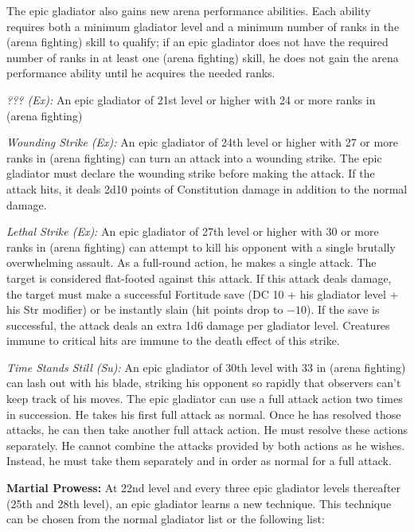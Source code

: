 The epic gladiator also gains new arena performance abilities. Each ability requires both a minimum gladiator level and a minimum number of ranks in the  (arena fighting) skill to qualify; if an epic gladiator does not have the required number of ranks in at least one  (arena fighting) skill, he does not gain the arena performance ability until he acquires the needed ranks.

\textit{??? (Ex):} An epic gladiator of 21st level or higher with 24 or more ranks in  (arena fighting)

\textit{Wounding Strike (Ex):} An epic gladiator of 24th level or higher with 27 or more ranks in  (arena fighting) can turn an attack into a wounding strike. The epic gladiator must declare the wounding strike before making the attack. If the attack hits, it deals 2d10 points of Constitution damage in addition to the normal damage.

\textit{Lethal Strike (Ex):}  An epic gladiator of 27th level or higher with 30 or more ranks in  (arena fighting) can attempt to kill his opponent with a single brutally overwhelming assault. As a full-round action, he makes a single attack. The target is considered flat-footed against this attack. If this attack deals damage, the target must make a successful Fortitude save (DC 10 + \onehalf his gladiator level + his Str modifier) or be instantly slain (hit points drop to $-10$). If the save is successful, the attack deals an extra 1d6 damage per gladiator level. Creatures immune to critical hits are immune to the death effect of this strike.

\textit{Time Stands Still (Su):} An epic gladiator of 30th level with 33 in  (arena fighting) can lash out with his blade, striking his opponent so rapidly that observers can't keep track of his moves. The epic gladiator can use a full attack action two times in succession. He takes his first full attack as normal. Once he has resolved those attacks, he can then take another full attack action. He must resolve these actions separately. He cannot combine the attacks provided by both actions as he wishes. Instead, he must take them separately and in order as normal for a full attack.

\textbf{Martial Prowess:} At 22nd level and every three epic gladiator levels thereafter (25th and 28th level), an epic gladiator learns a new technique. This technique can be chosen from the normal gladiator list or the following list:

